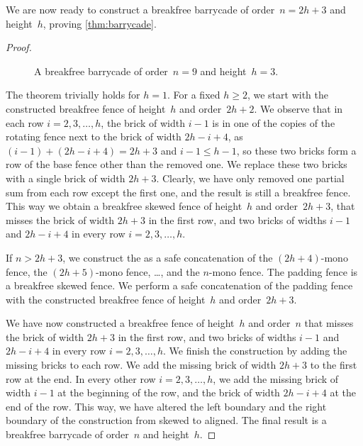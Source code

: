 \documentclass[runningheads,envcountsame]{llncs}
\let\le\leqslant
\let\ge\geqslant
\begin{document}
We are now ready to construct a breakfree barrycade of order~$n=2h+3$ and height~$h$, proving \cref{thm:barrycade}.

\thmbarrycade*
\begin{proof}
\begin{figure}[ht]
    \centering
    \caption{A breakfree barrycade of order~\(n=9\) and height~\(h=3\).}
    \label{fig:barrycade_final}
\end{figure}
    The theorem trivially holds for $h=1$.
    For a fixed $h\ge2$, we start with the constructed breakfree fence of height~$h$ and order~$2h+2$.
    We observe that in each row $i=2,3,\ldots,h$, the brick of width $i-1$ is in one of the copies of the rotating fence next to the brick of width $2h-i+4$, as $(i-1)+(2h-i+4)=2h+3$ and $i-1\le h-1$, so these two bricks form a row of the base fence other than the removed one.
    We replace these two bricks with a single brick of width $2h+3$.
    Clearly, we have only removed one partial sum from each row except the first one, and the result is still a breakfree fence.
    This way we obtain a breakfree skewed fence of height~$h$ and order~$2h+3$, that misses the brick of width $2h+3$ in the first row, and two bricks of widths $i-1$ and $2h-i+4$ in every row $i=2,3,\ldots,h$.

    If $n>2h+3$, we construct the  as a safe concatenation of the $(2h+4)$-mono fence, the $(2h+5)$-mono fence, \ldots, and the $n$-mono fence.
    The padding fence is a breakfree skewed fence.
    We perform a safe concatenation of the padding fence with the constructed breakfree fence of height~$h$ and order~$2h+3$.

    We have now constructed a breakfree fence of height~$h$ and order~$n$ that misses the brick of width $2h+3$ in the first row, and two bricks of widths $i-1$ and $2h-i+4$ in every row $i=2,3,\ldots,h$.
    We finish the construction by adding the missing bricks to each row.
    We add the missing brick of width $2h+3$ to the first row at the end.
    In every other row $i=2,3,\ldots,h$, we add the missing brick of width $i-1$ at the beginning of the row, and the brick of width $2h-i+4$ at the end of the row.
    This way, we have altered the left boundary and the right boundary of the construction from skewed to aligned.
    The final result is a breakfree barrycade of order~$n$ and height~$h$.
\end{proof}
\end{document}
